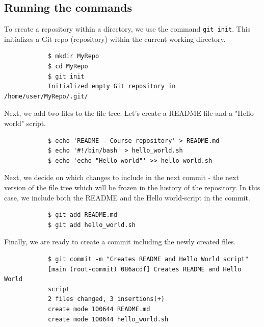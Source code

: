 \documentclass[../main/git_course_main.tex]{subfiles}
\begin{document}
	\subsection{Running the commands}
	
	To create a repository within a directory, we use the command \verb$git init$. This initializes a Git repo (repository) within the current working directory.
	
	\begin{codebox}
		\begin{lstlisting}
			$ mkdir MyRepo
			$ cd MyRepo
			$ git init
			Initialized empty Git repository in /home/user/MyRepo/.git/
		\end{lstlisting}
	\end{codebox}
	
	Next, we add two files to the file tree. Let's create a README-file and a "Hello world" script.
	
	\begin{codebox}
		\begin{lstlisting}
			$ echo 'README - Course repository' > README.md
			$ echo '#!/bin/bash' > hello_world.sh
			$ echo 'echo "Hello world"' >> hello_world.sh
		\end{lstlisting}
	\end{codebox}
	
	Next, we decide on which changes to include in the next commit - the next version of the file tree which will be frozen in the history of the repository. In this case, we 
	include both the README and the Hello world-script in the commit.
	
	\begin{codebox}
		\begin{lstlisting}
			$ git add README.md
			$ git add hello_world.sh
		\end{lstlisting}
	\end{codebox}
	
	Finally, we are ready to create a commit including the newly created files.
	
	\begin{codebox}
		\begin{lstlisting}
			$ git commit -m "Creates README and Hello World script"
			[main (root-commit) 086acdf] Creates README and Hello World 
			script
			2 files changed, 3 insertions(+)
			create mode 100644 README.md
			create mode 100644 hello_world.sh
		\end{lstlisting}
	\end{codebox}
	
\end{document}
